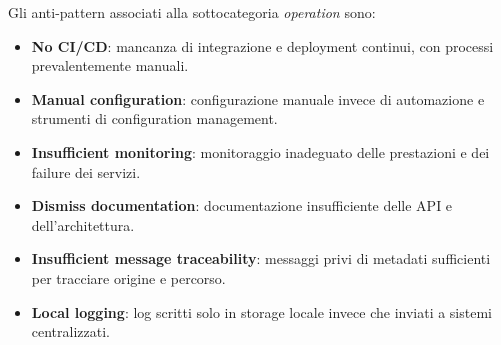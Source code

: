 Gli anti-pattern associati alla sottocategoria \textit{operation} sono:
\begin{itemize}
    \item \textbf{No CI/CD}: mancanza di integrazione e deployment continui, con processi prevalentemente manuali.
    \item \textbf{Manual configuration}: configurazione manuale invece di automazione e strumenti di configuration management.
    \item \textbf{Insufficient monitoring}: monitoraggio inadeguato delle prestazioni e dei failure dei servizi.
    \item \textbf{Dismiss documentation}: documentazione insufficiente delle API e dell’architettura.
    \item \textbf{Insufficient message traceability}: messaggi privi di metadati sufficienti per tracciare origine e percorso.
    \item \textbf{Local logging}: log scritti solo in storage locale invece che inviati a sistemi centralizzati.
\end{itemize}

